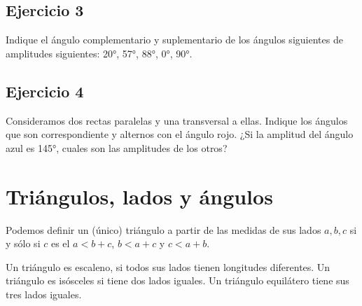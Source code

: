 \subsection{Ejercicio 3}

Indique el ángulo complementario y suplementario de los ángulos siguientes de
amplitudes siguientes: 20°, 57°, 88°, 0°, 90°.

\subsection{Ejercicio 4}

Consideramos dos rectas paralelas y una transversal a ellas.
Indique los ángulos que son correspondiente y alternos con el ángulo rojo.
¿Si la amplitud del ángulo azul es 145°, cuales son las amplitudes de los otros?

\begin{center}


\end{center}

\section{Triángulos, lados y ángulos}

Podemos definir un (único) triángulo a partir de las medidas de sus lados
$a, b, c$ si y sólo si $c$ es el $a < b + c$, $b < a + c$ y $c < a + b$.

\begin{center}


\end{center}

Un triángulo es escaleno, si todos sus lados tienen longitudes diferentes.
Un triángulo es isósceles si tiene dos lados iguales. Un triángulo equilátero
tiene sus tres lados iguales.

